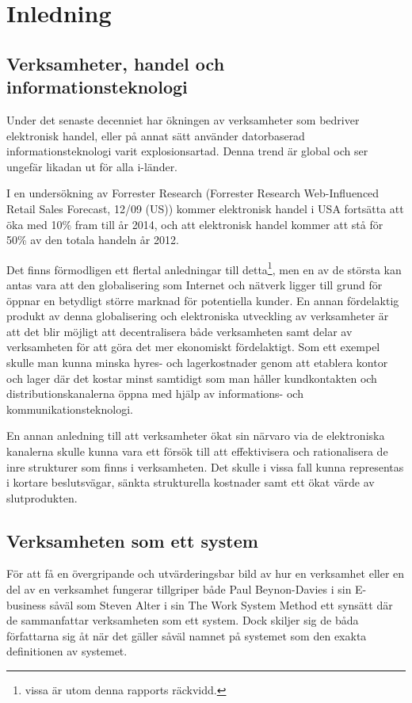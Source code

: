 \documentclass[12pt,a4paper,titlepage]{article}
\begin{document}


\section{\textsf{Inledning}}
\subsection{\textsf{Verksamheter, handel och informationsteknologi}}

Under det senaste decenniet har ökningen av verksamheter som bedriver elektronisk handel, eller på annat sätt använder datorbaserad informationsteknologi varit explosionsartad. Denna trend är global och ser ungefär likadan ut för alla i-länder. %

I en undersökning av Forrester Research (Forrester Research Web-Influenced Retail Sales Forecast, 12/09 (US)) kommer elektronisk handel i USA fortsätta att öka med 10\% fram till år 2014, och att elektronisk handel kommer att stå för 50\% av den totala handeln år 2012.

Det finns förmodligen ett flertal anledningar till detta\footnote{vissa är utom denna rapports räckvidd.}, men en av de största kan antas vara att den globalisering som Internet och nätverk ligger till grund för öppnar en betydligt större marknad för potentiella kunder. En annan fördelaktig produkt av denna globalisering och elektroniska utveckling av verksamheter är att det blir möjligt att decentralisera både verksamheten samt delar av verksamheten för att göra det mer ekonomiskt fördelaktigt. Som ett exempel skulle man kunna minska hyres- och lagerkostnader genom att etablera kontor och lager där det kostar minst samtidigt som man håller kundkontakten och distributionskanalerna öppna med hjälp av informations- och kommunikationsteknologi.

En annan anledning till att verksamheter ökat sin närvaro via de elektroniska kanalerna skulle kunna vara ett försök till att effektivisera och rationalisera de inre strukturer som finns i verksamheten. Det skulle i vissa fall kunna representas i kortare beslutsvägar, sänkta strukturella kostnader samt ett ökat värde av slutprodukten.

\subsection{\textsf{Verksamheten som ett system}}
För att få en övergripande och utvärderingsbar bild av hur en verksamhet eller en del av en verksamhet fungerar tillgriper både Paul Beynon-Davies i sin E-business såväl som Steven Alter i sin The Work System Method ett synsätt där de sammanfattar verksamheten som ett system. Dock skiljer sig de båda författarna sig åt när det gäller såväl namnet på systemet som den exakta definitionen av systemet.
\end{document}
